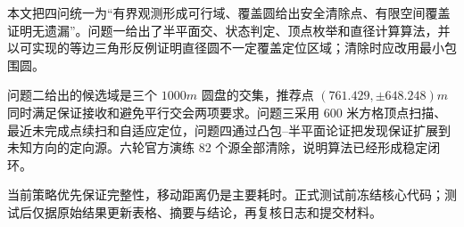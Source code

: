 本文把四问统一为“有界观测形成可行域、覆盖圆给出安全清除点、有限空间覆盖证明无遗漏”。问题一给出了半平面交、状态判定、顶点枚举和直径计算算法，并以可实现的等边三角形反例证明直径圆不一定覆盖定位区域；清除时应改用最小包围圆。

问题二给出的候选域是三个 $1000\unit{m}$ 圆盘的交集，推荐点
$(761.429,\pm648.248)\unit{m}$ 同时满足保证接收和避免平行交会两项要求。问题三采用 600 米方格顶点扫描、最近未完成点续扫和自适应定位，问题四通过凸包--半平面论证把发现保证扩展到未知方向的定向源。六轮官方演练 82 个源全部清除，说明算法已经形成稳定闭环。

当前策略优先保证完整性，移动距离仍是主要耗时。正式测试前冻结核心代码；测试后仅据原始结果更新表格、摘要与结论，再复核日志和提交材料。

